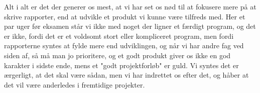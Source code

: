 \documentclass[10pt,a4paper,danish]{article}
\begin{document}
Alt i alt er det der generer os mest, at vi har set os nød til at fokusere mere
på at skrive rapporter, end at udvikle et produkt vi kunne være tilfreds med.
Her et par uger før eksamen står vi ikke med noget der ligner et færdigt program,
og det er ikke, fordi det er et voldsomt stort eller kompliceret program, men
fordi rapporterne syntes at fylde mere end udviklingen, og når vi har andre fag
ved siden af, så må man jo prioritere, og et godt produkt giver os ikke en god
karakter i sidste ende, mens et "godt projektforløb" er guld. Vi syntes det er
ærgerligt, at det skal være sådan, men vi har indrettet os efter det, og håber
at det vil være anderledes i fremtidige projekter.
\end{document}
